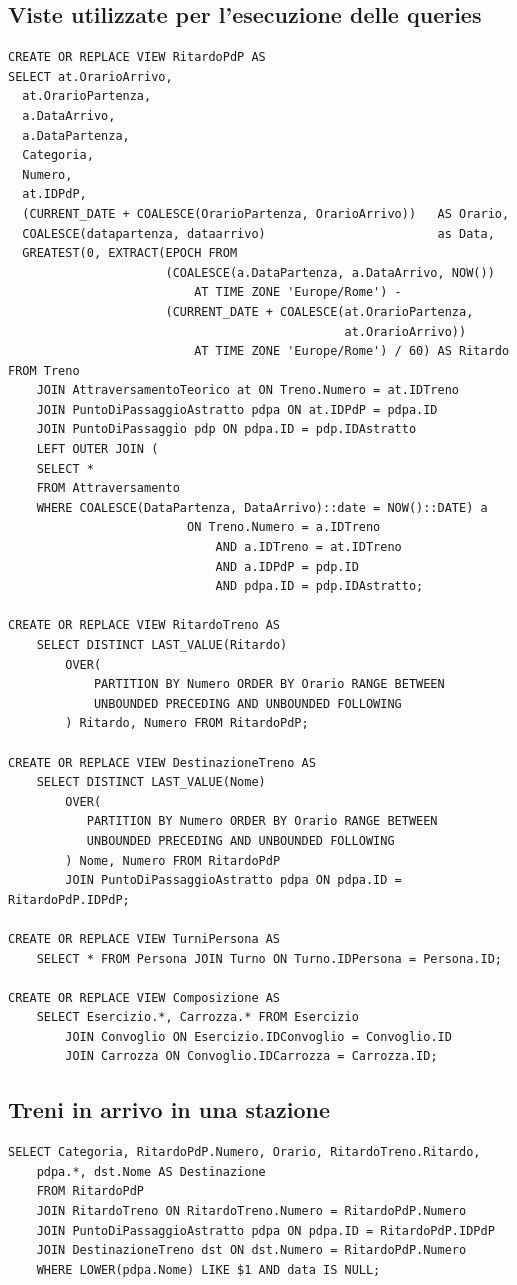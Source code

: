 \documentclass[a4paper,12pt]{report}
\begin{document}
	\subsection{Viste utilizzate per l'esecuzione delle queries}
	\begin{verbatim}
CREATE OR REPLACE VIEW RitardoPdP AS
SELECT at.OrarioArrivo,
  at.OrarioPartenza,
  a.DataArrivo,
  a.DataPartenza,
  Categoria,
  Numero,
  at.IDPdP,
  (CURRENT_DATE + COALESCE(OrarioPartenza, OrarioArrivo))   AS Orario,
  COALESCE(datapartenza, dataarrivo)                        as Data,
  GREATEST(0, EXTRACT(EPOCH FROM
                      (COALESCE(a.DataPartenza, a.DataArrivo, NOW())
                          AT TIME ZONE 'Europe/Rome') -
                      (CURRENT_DATE + COALESCE(at.OrarioPartenza,
                                               at.OrarioArrivo))
                          AT TIME ZONE 'Europe/Rome') / 60) AS Ritardo
FROM Treno
    JOIN AttraversamentoTeorico at ON Treno.Numero = at.IDTreno
    JOIN PuntoDiPassaggioAstratto pdpa ON at.IDPdP = pdpa.ID
    JOIN PuntoDiPassaggio pdp ON pdpa.ID = pdp.IDAstratto
    LEFT OUTER JOIN (
    SELECT *
    FROM Attraversamento
    WHERE COALESCE(DataPartenza, DataArrivo)::date = NOW()::DATE) a
                         ON Treno.Numero = a.IDTreno
                             AND a.IDTreno = at.IDTreno
                             AND a.IDPdP = pdp.ID
                             AND pdpa.ID = pdp.IDAstratto;

CREATE OR REPLACE VIEW RitardoTreno AS
    SELECT DISTINCT LAST_VALUE(Ritardo)
        OVER(
            PARTITION BY Numero ORDER BY Orario RANGE BETWEEN
            UNBOUNDED PRECEDING AND UNBOUNDED FOLLOWING
        ) Ritardo, Numero FROM RitardoPdP;

CREATE OR REPLACE VIEW DestinazioneTreno AS
    SELECT DISTINCT LAST_VALUE(Nome)
        OVER(
           PARTITION BY Numero ORDER BY Orario RANGE BETWEEN
           UNBOUNDED PRECEDING AND UNBOUNDED FOLLOWING
        ) Nome, Numero FROM RitardoPdP
        JOIN PuntoDiPassaggioAstratto pdpa ON pdpa.ID = RitardoPdP.IDPdP;

CREATE OR REPLACE VIEW TurniPersona AS
    SELECT * FROM Persona JOIN Turno ON Turno.IDPersona = Persona.ID;

CREATE OR REPLACE VIEW Composizione AS
    SELECT Esercizio.*, Carrozza.* FROM Esercizio
        JOIN Convoglio ON Esercizio.IDConvoglio = Convoglio.ID
        JOIN Carrozza ON Convoglio.IDCarrozza = Carrozza.ID;
	\end{verbatim}
	\subsection{Treni in arrivo in una stazione}
	\begin{verbatim}
SELECT Categoria, RitardoPdP.Numero, Orario, RitardoTreno.Ritardo,
    pdpa.*, dst.Nome AS Destinazione
    FROM RitardoPdP
    JOIN RitardoTreno ON RitardoTreno.Numero = RitardoPdP.Numero
    JOIN PuntoDiPassaggioAstratto pdpa ON pdpa.ID = RitardoPdP.IDPdP
    JOIN DestinazioneTreno dst ON dst.Numero = RitardoPdP.Numero
    WHERE LOWER(pdpa.Nome) LIKE $1 AND data IS NULL;
	\end{verbatim}
\end{document}
